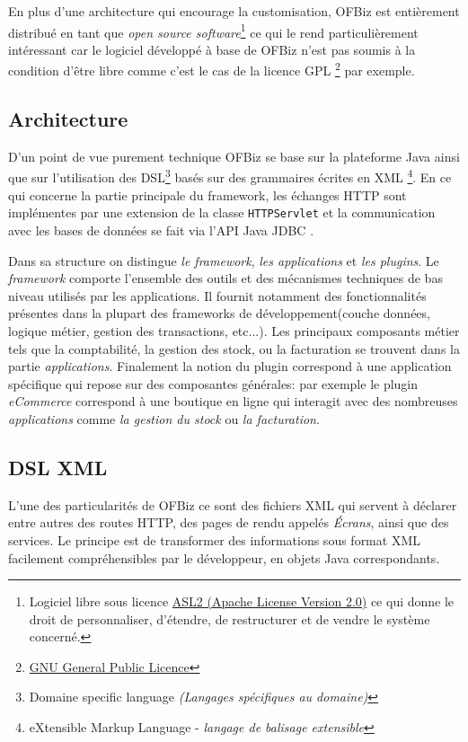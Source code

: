 En plus d'une architecture qui encourage la customisation, OFBiz est entièrement distribué en tant que \emph{open source software}\footnote{Logiciel libre sous licence \href{https://www.apache.org/licenses/LICENSE-2.0.html}{ASL2 (Apache License Version 2.0)} ce qui donne le droit de personnaliser, d'étendre, de restructurer et de vendre le système concerné. } ce qui le rend particulièrement intéressant car le logiciel développé à base de OFBiz n'est pas soumis à la condition d'être libre comme c'est le cas de la licence GPL  \footnote{\href{http://www.gnu.org/licenses/gpl-3.0.html}{GNU General Public Licence}} par exemple.

\subsection{Architecture }
\label{architecture}
D'un point de vue purement technique OFBiz se base sur la plateforme Java ainsi que sur l'utilisation des DSL\footnote{Domaine specific language \emph{(Langages spécifiques au domaine)}} basés sur des grammaires écrites en XML \footnote{ eXtensible Markup Language - \emph{langage de balisage extensible}}. En ce qui concerne la partie principale du framework, les échanges HTTP sont implémentes par une extension de la classe \verb=HTTPServlet= \cite{chan2017servlet} et la communication avec les bases de données se fait via l'API Java JDBC \cite{JDBC}.

Dans sa structure on distingue \emph{le framework}, \emph{les applications} et \emph{les plugins}. Le \emph{framework} comporte l'ensemble des outils et des mécanismes techniques de bas niveau utilisés par les applications. Il fournit notamment des fonctionnalités présentes dans la plupart des frameworks de développement(couche données, logique métier, gestion des transactions, etc...).
Les principaux composants métier tels que la comptabilité, la gestion des stock, ou la facturation se trouvent dans la partie \emph{applications}. 
Finalement la notion du plugin  correspond à une application spécifique qui repose sur des composantes générales: par exemple le plugin \emph{eCommerce} correspond à une boutique en ligne qui interagit avec des nombreuses \emph{applications} comme \emph{la gestion du stock} ou \emph{la facturation}. 

\subsection{DSL XML}
\label{dsl}
L'une des particularités de OFBiz ce sont des fichiers XML qui servent à déclarer entre autres
des routes HTTP, des pages de rendu appelés \emph{Écrans}, ainsi que des services. Le principe est de transformer des informations sous format XML facilement compréhensibles par le développeur, en objets Java correspondants. 


